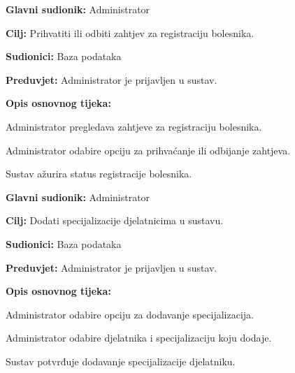 \documentclass{article}
\begin{document}
\vspace{1em} %
\begin{packed_item}
\item \textbf{Glavni sudionik:} Administrator
\item \textbf{Cilj:} Prihvatiti ili odbiti zahtjev za registraciju bolesnika.
\item \textbf{Sudionici:} Baza podataka
\item \textbf{Preduvjet:} Administrator je prijavljen u sustav.
\item \textbf{Opis osnovnog tijeka:}
\begin{packed_enum}
\item Administrator pregledava zahtjeve za registraciju bolesnika.
\item Administrator odabire opciju za prihvaćanje ili odbijanje zahtjeva.
\item Sustav ažurira status registracije bolesnika.
\end{packed_enum}
\end{packed_item}

\vspace{1em} %
\begin{packed_item}
\item \textbf{Glavni sudionik:} Administrator
\item \textbf{Cilj:} Dodati specijalizacije djelatnicima u sustavu.
\item \textbf{Sudionici:} Baza podataka
\item \textbf{Preduvjet:} Administrator je prijavljen u sustav.
\item \textbf{Opis osnovnog tijeka:}
\begin{packed_enum}
\item Administrator odabire opciju za dodavanje specijalizacija.
\item Administrator odabire djelatnika i specijalizaciju koju dodaje.
\item Sustav potvrđuje dodavanje specijalizacije djelatniku.
\end{packed_enum}
\end{packed_item}
\end{document}

